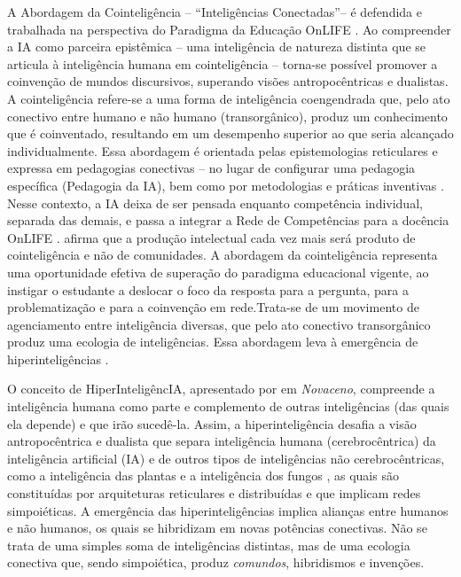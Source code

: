 \documentclass[portuguese]{textolivre}
\begin{document}
A Abordagem da Cointeligência – “Inteligências Conectadas”– é defendida e trabalhada na perspectiva do Paradigma da Educação OnLIFE \cite{schlemmer2024inteligencias}. Ao compreender a IA como parceira epistêmica – uma inteligência de natureza distinta que se articula à inteligência humana em cointeligência – torna-se possível promover a coinvenção de mundos discursivos, superando visões antropocêntricas e dualistas. A cointeligência refere-se a uma forma de inteligência coengendrada que, pelo ato conectivo entre humano e não humano (transorgânico), produz um conhecimento que é coinventado, resultando em um desempenho superior ao que seria alcançado individualmente. Essa abordagem é orientada pelas epistemologias reticulares \cite{difelice2012redessociais} e expressa em pedagogias conectivas \cite{schlemmer2023protagonismo} – no lugar de configurar uma pedagogia específica (Pedagogia da IA), bem como por metodologias e práticas inventivas \cite{schlemmer2022metodologias}. Nesse contexto, a IA deixa de ser pensada enquanto competência individual, separada das demais, e passa a integrar a Rede de Competências para a docência OnLIFE \cite{schlemmer2018projetos,schlemmer2022metodologias}. \textcite{mollick2024cointelligence} afirma que a produção intelectual cada vez mais será produto de cointeligência e não de comunidades. A abordagem da cointeligência representa uma oportunidade efetiva de superação do paradigma educacional vigente, ao instigar o estudante a deslocar o foco da resposta para a pergunta, para a problematização e para a coinvenção em rede.Trata-se de um movimento de agenciamento entre inteligência diversas, que pelo ato conectivo transorgânico \cite{difelice2017netativismo} produz uma ecologia de inteligências. Essa abordagem leva à emergência de hiperinteligências \cite{lovelock2019novacene}.


O conceito de HiperInteligêncIA, apresentado por \textcite{lovelock2019novacene} em \textit{Novaceno}, compreende a inteligência humana como parte e complemento de outras inteligências (das quais ela depende) e que irão sucedê-la. Assim, a hiperinteligência desafia a visão antropocêntrica e dualista que separa inteligência humana (cerebrocêntrica) da inteligência artificial (IA) e de outros tipos de inteligências não cerebrocêntricas, como a inteligência das plantas \cite{mancuso2017plantrevolution} e a inteligência dos fungos \cite{sheldrake2020entangledlife}, as quais são constituídas por arquiteturas reticulares e distribuídas e que implicam redes simpoiéticas. A emergência das hiperinteligências implica alianças entre humanos e não humanos, os quais se hibridizam em novas potências conectivas. Não se trata de uma simples soma de inteligências distintas, mas de uma ecologia conectiva que, sendo simpoiética, produz \textit{comundos}, hibridismos e invenções.
\end{document}
